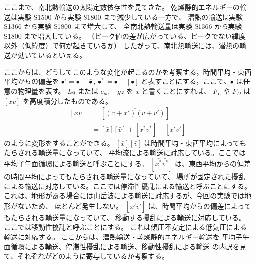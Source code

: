 \documentclass[body]{subfiles}
\begin{document}
ここまで、南北熱輸送の太陽定数依存性を見てきた。
乾燥静的エネルギーの輸送は実験 S1500 から実験 S1800 まで減少している一方で、
潜熱の輸送は実験 S1366 から実験 S1800 まで増大して、
全南北熱輸送量は実験 S1366 から実験 S1800 まで増大している。
（ピーク値の差が広がっている、ピークでない緯度以外（低緯度）で何が起きているか）
したがって、南北熱輸送には、潜熱の輸送が効いているといえる。

ここからは、どうしてこのような変化が起こるのかを考察する。時間平均・東西平均からの偏差を
\(\bullet'=\bullet-\bar\bullet, \bullet^*=\bullet-[\bullet]\)
と表すことにする。ここで、\(\bullet\) は任意の物理量を表す。
\(Lq\) または \(c_{pn}+gz\) を \(x\) と書くことにすれば、
\(F_L\) や \(F_D\) は \([xv]\) を高度積分したものである。
\begin{equation}
	\begin{split}
		[\overline{xv}]&=[\overline{(\bar x+x')(\bar v+v')}]\\
		&=[\bar x][\bar v]+[\bar{x^*}\bar{v^*}]+[\overline{x'v'}]
	\end{split}\label{keith5}
\end{equation}
のように変形をすることができる。
\([\bar x][\bar v]\) は時間平均・東西平均によってもたらされる輸送量になっていて、
平均流による輸送に対応している。ここでは平均子午面循環による輸送と呼ぶことにする。
\([\bar{x^*}\bar{v^*}]\) は、東西平均からの偏差の時間平均によってもたらされる輸送量になっていて、
場所が固定された擾乱による輸送に対応している。ここでは停滞性擾乱による輸送と呼ぶことにする。
これは、地形がある場合には山岳波による輸送に対応するが、今回の実験では地形がないため、
ほとんど発生しない。
\([\overline{x'v'}]\) は、時間平均からの偏差によってもたらされる輸送量になっていて、
移動する擾乱による輸送に対応している。ここでは移動性擾乱と呼ぶことにする。
これは傾圧不安定による低気圧による輸送に対応する。
ここからは、潜熱輸送・乾燥静的エネルギー輸送を
平均子午面循環による輸送、停滞性擾乱による輸送、移動性擾乱による輸送
の内訳を見て、それぞれがどのように寄与しているか考察する。
\end{document}

